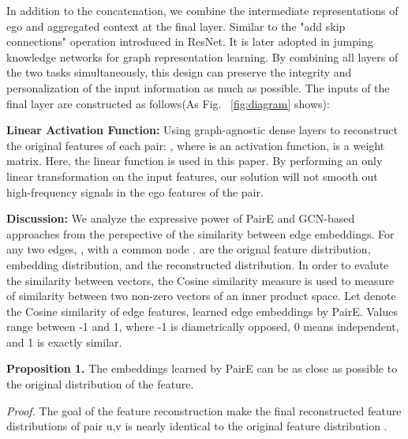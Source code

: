 \documentclass[10pt,journal,compsoc]{IEEEtran}
\begin{document}
In addition to the concatenation, we combine the intermediate representations of ego and aggregated context at the final layer. Similar to the "add skip connections" operation introduced in ResNet\cite{He16}. It is later adopted in jumping knowledge networks for graph representation learning\cite{xu2018representation}. By combining all layers of the two tasks simultaneously, this design can preserve the integrity and personalization of the input information as much as possible. The inputs of the final layer are constructed as follows(As Fig. ~\ref{fig:diagram} shows):
 


\noindent\textbf{Linear Activation Function:} Using  graph-agnostic dense layers to reconstruct the original features of each pair: , where  is an activation function,  is a weight matrix. Here, the linear function is used in this paper. By performing an only linear transformation on the input features, our solution will not smooth out high-frequency signals in the ego features of the pair. 




\noindent\textbf{Discussion:}  
We analyze the expressive power of PairE and GCN-based approaches from the perspective of the similarity between edge embeddings. For any two edges, , with a common node .  are the orignal feature distribution, embedding distribution, and the reconstructed distribution. In order to evalute the similarity between vectors, the Cosine similarity measure is used to measure of similarity between two non-zero vectors of an inner product space. Let  denote the Cosine similarity of edge features, learned edge embeddings by PairE. Values range between -1 and 1, where -1 is diametrically opposed, 0 means independent, and 1 is exactly similar.









 

\noindent\textbf{Proposition 1.} The embeddings learned by PairE can be as close as possible to the original distribution of the feature. 







\noindent\textit{Proof.} The goal of the feature reconstruction make the final reconstructed feature distributions of pair u,v  is nearly identical to the original feature distribution .
   
\end{document}
